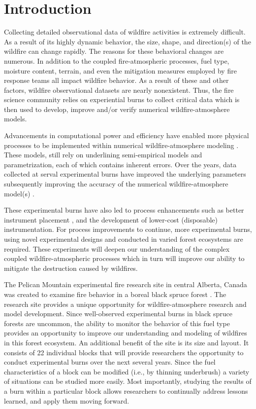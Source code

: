\documentclass[preprints,article,accept,moreauthors,pdftex]{Definitions/mdpi}
\begin{document}
\section{Introduction}


Collecting detailed observational data of wildfire activities is extremely difficult. As a result of its highly dynamic behavior, the size, shape, and direction(s) of the wildfire can change rapidly. The reasons for these behavioral changes are numerous. In addition to the coupled fire-atmospheric processes, fuel type, moisture content, terrain, and even the mitigation measures employed by fire response teams all impact wildfire behavior. As a result of these and other factors, wildfire observational datasets are nearly nonexistent. Thus, the fire science community relies on experiential burns to collect critical data which is then used to develop, improve and/or verify numerical wildfire-atmosphere models.

Advancements in computational power and efficiency have enabled more physical processes to be implemented within numerical wildfire-atmosphere modeling \cite{kochanski_experimental_2018}. These models, still rely on underlining semi-empirical models and parametrization, each of which contains inherent errors. Over the years, data collected at serval experimental burns have improved the underlying parameters subsequently improving the accuracy of the numerical wildfire-atmosphere model(s) \cite{kochanski_experimental_2018,mallia_incorporating_2020,moisseeva_capturing_2019,kochanski_evaluation_2013,coen_requirements_2018}.

These experimental burns have also led to process enhancements such as better instrument placement \cite{kochanski_experimental_2018}, and the development of lower-cost (disposable) instrumentation. For process improvements to continue, more experimental burns, using novel experimental designs and conducted in varied forest ecosystems are required. These experiments will deepen our understanding of the complex coupled wildfire-atmospheric processes which in turn will improve our ability to mitigate the destruction caused by wildfires.

The Pelican Mountain experimental fire research site in central Alberta, Canada was created to examine fire behavior in a boreal black spruce forest \cite{thompson_recent_2020}. The research site provides a unique opportunity for wildfire-atmosphere research and model development. Since well-observed experimental burns in black spruce forests are uncommon, the ability to monitor the behavior of this fuel type provides an opportunity to improve our understanding and modeling of wildfires in this forest ecosystem. An additional benefit of the site is its size and layout. It consists of 22 individual blocks that will provide researchers the opportunity to conduct experimental burns over the next several years. Since the fuel characteristics of a block can be modified (i.e., by thinning underbrush) a variety of situations can be studied more easily. Most importantly, studying the results of a burn within a particular block allows researchers to continually address lessons learned, and apply them moving forward.
\end{document}
